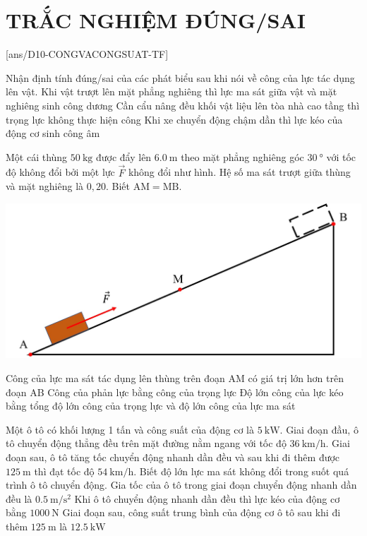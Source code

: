 \section{TRẮC NGHIỆM ĐÚNG/SAI}
\setcounter{ex}{0}
[ans/D10-CONGVACONGSUAT-TF]
\begin{ex}
	Nhận định tính đúng/sai của các phát biểu sau khi nói về công của lực tác dụng lên vật.
	{Khi vật trượt lên mặt phẳng nghiêng thì lực ma sát giữa vật và mặt nghiêng sinh công dương}
	{Cần cẩu nâng đều khối vật liệu lên tòa nhà cao tầng thì trọng lực không thực hiện công}
	{Khi xe chuyển động chậm dần thì lực kéo của động cơ sinh công âm}
	\loigiai{}
\end{ex}
\begin{ex}
	Một cái thùng $\SI{50}{\kilogram}$ được đẩy lên $\SI{6.0}{\meter}$ theo mặt phẳng nghiêng góc $\SI{30}{\degree}$ với tốc độ  không đổi bởi một lực $\vec{F}$ không đổi như hình. Hệ số ma sát trượt giữa thùng và mặt nghiêng là $0,20$. Biết $\mathrm{AM}=\mathrm{MB}$.
	\begin{center}
		\includegraphics[scale=0.35]{../figs/VN10-2023-PH-TP024-P-8}
	\end{center}
	{Công của lực ma sát tác dụng lên thùng trên đoạn AM có giá trị lớn hơn trên đoạn AB}
	{Công của phản lực bằng công của trọng lực}
	{Độ lớn công của lực kéo bằng tổng độ lớn công của trọng lực và độ lớn công của lực ma sát}
	\loigiai{}
\end{ex}
\begin{ex}
	Một ô tô có khối lượng 1 tấn và công suất của động cơ là $\SI{5}{\kilo\watt}$. Giai đoạn đầu, ô tô chuyển động thẳng đều trên mặt đường nằm ngang với tốc độ $\SI{36}{\kilo\meter/\hour}$. Giai đoạn sau, ô tô tăng tốc chuyển động nhanh dần đều và sau khi đi thêm được $\SI{125}{\meter}$ thì đạt tốc độ $\SI{54}{\kilo\meter/\hour}$. Biết độ lớn lực ma sát không đổi trong suốt quá trình ô tô chuyển động.
	{\True Gia tốc của ô tô trong giai đoạn chuyển động nhanh dần đều là $\SI{0.5}{\meter/\second^2}$}
	{\True Khi ô tô chuyển động nhanh dần đều thì lực kéo của động cơ bằng $\SI{1000}{\newton}$}
	{\True Giai đoạn sau, công suất trung bình của động cơ ô tô sau khi đi thêm $\SI{125}{\meter}$ là $\SI{12.5}{\kilo\watt}$}
	\loigiai{}
\end{ex}
